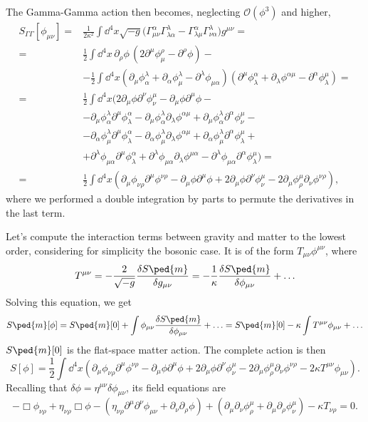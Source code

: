 \documentclass[a4paper,12pt]{book}
\begin{document}
The Gamma-Gamma action then becomes, neglecting $\mathcal O(\phi^3)$ and higher,
\begin{align*}
S_{\Gamma\Gamma}[\phi_{\mu\nu}]={}&\frac1{2\kappa^2}\int\dd^4x\sqrt{-g}\bigl(\Gamma^\alpha_{\mu\nu}\Gamma^\lambda_{\lambda\alpha}-\Gamma^\alpha_{\lambda\mu}\Gamma^\lambda_{\nu\alpha}\bigr)g^{\mu\nu}=\\
={}&\frac12\int\dd^4x\,\partial_\rho\phi\,(2\partial^\mu\phi^\rho_\mu-\partial^\rho\phi)-{}\\
&-\frac12\int\dd^4x(\partial_\mu\phi^\lambda_\alpha+\partial_\alpha\phi^\lambda_\mu-\partial^\lambda\phi_{\mu\alpha})(\partial^\mu\phi^\alpha_\lambda+\partial_\lambda\phi^{\alpha\mu}-\partial^\alpha\phi_\lambda^\mu)=\\
={}&\frac12\int\dd^4x(2\partial_\mu\phi\partial^\nu\phi^\mu_\nu-\partial_\mu\phi\partial^\mu\phi-{}\\
&-\partial_\mu\phi^\lambda_\alpha\partial^\mu\phi^\alpha_\lambda-\partial_\mu\phi^\lambda_\alpha\partial_\lambda\phi^{\alpha\mu}+\partial_\mu\phi^\lambda_\alpha\partial^\alpha\phi^\mu_\nu-{}\\
&-\partial_\alpha\phi^\lambda_\mu\partial^\mu\phi^\alpha_\lambda-\partial_\alpha\phi^\lambda_\mu\partial_\lambda\phi^{\alpha\mu}+\partial_\alpha\phi^\lambda_\mu\partial^\alpha\phi^\mu_\lambda+{}\\
&+\partial^\lambda\phi_{\mu\alpha}\partial^\mu\phi^\alpha_\lambda+\partial^\lambda\phi_{\mu\alpha}\partial_\lambda\phi^{\mu\alpha}-\partial^\lambda\phi_{\mu\alpha}\partial^\alpha\phi^\mu_\lambda)=\\
={}&\frac12\int\dd^4x(\partial_\mu\phi_{\nu\rho}\partial^\mu\phi^{\nu\rho}-\partial_\mu\phi\partial^\mu\phi+2\partial_\mu\phi\partial^\nu\phi^\mu_\nu-2\partial_\mu\phi^\mu_\rho\partial_\nu\phi^{\nu\rho}),
\end{align*}
where we performed a double integration by parts to permute the derivatives in the last term.

Let's compute the interaction terms between gravity and matter to the lowest order, considering for simplicity the bosonic case. It is of the form $T_{\mu\nu}\phi^{\mu\nu}$, where
\[T^{\mu\nu}=-\frac2{\sqrt{-g}}\frac{\delta S\ped{m}}{\delta g_{\mu\nu}}=-\frac1\kappa\frac{\delta S\ped{m}}{\delta\phi_{\mu\nu}}+\ldots\]
Solving this equation, we get
\[S\ped{m}[\phi]=S\ped{m}[0]+\int\phi_{\mu\nu}\frac{\delta S\ped{m}}{\delta\phi_{\mu\nu}}+\ldots=S\ped{m}[0]-\kappa\int T^{\mu\nu}\phi_{\mu\nu}+\ldots\]
$S\ped{m}[0]$ is the flat-space matter action. The complete action is then
\[S[\phi]=\frac12\int\dd^4x(\partial_\mu\phi_{\nu\rho}\partial^\mu\phi^{\nu\rho}-\partial_\mu\phi\partial^\mu\phi+2\partial_\mu\phi\partial^\nu\phi^\mu_\nu-2\partial_\mu\phi^\mu_\rho\partial_\nu\phi^{\nu\rho}-2\kappa T^{\mu\nu}\phi_{\mu\nu}).\]
Recalling that $\delta\phi=\eta^{\mu\nu}\delta\phi_{\mu\nu}$, its field equations are
\[-\Box\phi_{\nu\rho}+\eta_{\nu\rho}\Box\phi-(\eta_{\nu\rho}\partial^\mu\partial^\nu\phi_{\mu\nu}+\partial_\nu\partial_\rho\phi)+(\partial_\mu\partial_\nu\phi^\mu_\rho+\partial_\mu\partial_\rho\phi^\mu_\nu)-\kappa T_{\nu\rho}=0.\]
\end{document}
